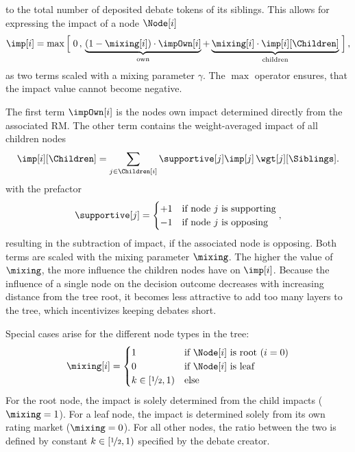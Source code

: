 \documentclass[%
aip,
amsmath,amssymb,
reprint,%
unsortedaddress,
nofootinbib
]{revtex4-2}
\begin{document}
to the total number of deposited debate tokens of its siblings.
This allows for expressing the impact of a node $\Node[i]$ 
\begin{equation}\label{eq:Impact}
	\imp[i] = 
	\max
	\left[\vphantom{\sum}\right.
	0
	\,,\,
	\underbrace{(1-\mixing[i])\cdot\impOwn[i]}_{\text{own}} 
	+
	\underbrace{\mixing[i]\cdot\imp[i][\Children]}_{\text{children}}
	\left.\vphantom{\sum}\right],
\end{equation}
as two terms scaled with a mixing parameter $\gamma$.
The $\max$ operator ensures, that the impact value cannot become negative.


The first term $\impOwn[i]$ is the nodes own impact determined directly from the associated \ac{RM}.
The other term contains the weight-averaged impact of all children nodes 
\begin{equation}
	\imp[i][\Children] = \sum_{j\in \Children[i]} \supportive[j]%
	\imp[j]\,\wgt[j][\Siblings].
\end{equation}
with the prefactor
\begin{equation}
	\supportive[j]%
	=
	\begin{cases}
		+1 & \text{if node $j$ is supporting}\\ %
		-1 & \text{if node $j$ is opposing} %
	\end{cases},
\end{equation}
resulting in the subtraction of impact, if the associated node is opposing.
Both terms are scaled with the mixing parameter $\mixing$.
The higher the value of $\mixing$, the more influence the children nodes have on $\imp[i]$.
Because the influence of a single node on the decision outcome decreases with increasing distance from the tree root, 
it becomes less attractive to add too many layers to the tree, which incentivizes keeping debates short.

Special cases arise for the different node types in the tree:
\begin{equation}
	\mixing[i] =
	\begin{cases}
		1 & \text{if $\Node[i]$ is root ($i=0$)}\\
		0 & \text{if $\Node[i]$ is leaf}\\
		k \in[\nicefrac{1}{2},1) & \text{else}
	\end{cases}
\end{equation}
For the root node, the impact is solely determined from the child impacts  ($\mixing=1$).
For a leaf node, the impact is determined solely from its own rating market ($\mixing=0$).
For all other nodes,
the ratio between the two is defined by constant $k\in[\nicefrac{1}{2},1)$ specified by the debate creator.
\end{document}
